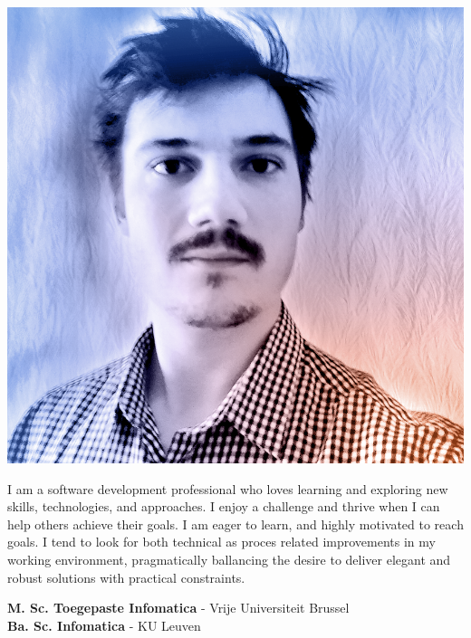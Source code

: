 \documentclass[9pt, blue, square]{developercv} %
\begin{document}
	\vspace{0.5cm}
	
	
	
	
	\begin{minipage}[t]{0.25\textwidth} %
		\vspace{-\baselineskip} %
		\vspace{0.38cm}
		
		\colorbox{darkCalmBlue}{\includegraphics[width=\linewidth]{img/stijn}}
		
	\end{minipage}
	\hfill %
	\begin{minipage}[t]{0.70\textwidth} %
		\vspace{-\baselineskip} %
		
		I am a software development professional who loves learning and exploring new skills, technologies, and approaches. I enjoy a challenge and thrive when I can help others achieve their goals. I am eager to learn, and highly motivated to reach goals. I tend to look for  both technical as proces related improvements in my working environment, pragmatically ballancing the desire to deliver elegant and robust solutions with practical constraints.
		
		
		\textbf{M. Sc. Toegepaste Infomatica} - \textcolor{accentbackground}{Vrije Universiteit Brussel} \\
		\textbf{Ba. Sc. Infomatica} - \textcolor{accentbackground}{KU Leuven}
		
	\end{minipage}
	
\end{document}
